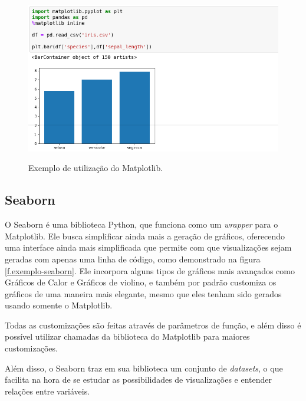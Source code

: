 \begin{figure}[h]
\caption{\small Exemplo de utilização do Matplotlib.}
\centering
\includegraphics[scale=2]{figs/exemplo-pyplot.png}
\label{f.exemplo-matplotlib}
\end{figure}

\subsection{Seaborn}
\label{ss.seaborn}

O Seaborn é uma biblioteca Python, que funciona como um \textit{wrapper} para o Matplotlib. Ele busca simplificar ainda mais a geração de gráficos, oferecendo uma interface ainda mais simplificada que permite com que visualizações sejam geradas com apenas uma linha de código, como demonstrado na figura \ref{f.exemplo-seaborn}. Ele incorpora alguns tipos de gráficos mais avançados como Gráficos de Calor e Gráficos de violino, e também por padrão customiza os gráficos de uma maneira mais elegante, mesmo que eles tenham sido gerados usando somente o Matplotlib.

Todas as customizações são feitas através de parâmetros de função, e além disso é possível utilizar chamadas da biblioteca do Matplotlib para maiores customizações.

Além disso, o Seaborn traz em sua biblioteca um conjunto de \textit{datasets}, o que facilita na hora de se estudar as possibilidades de visualizações e entender relações entre variáveis.


